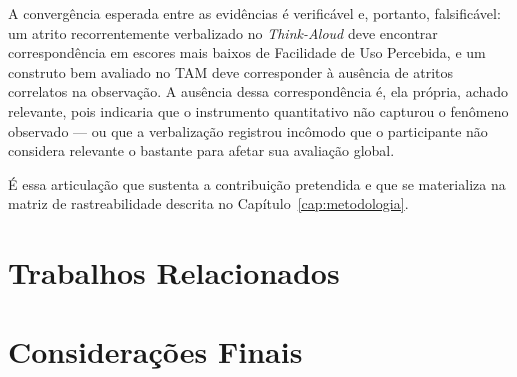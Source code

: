 A convergência esperada entre as evidências é verificável e, portanto,
falsificável: um atrito recorrentemente verbalizado no \textit{Think-Aloud} deve
encontrar correspondência em escores mais baixos de Facilidade de Uso Percebida, e
um construto bem avaliado no TAM deve corresponder à ausência de atritos
correlatos na observação. A ausência dessa correspondência é, ela própria, achado
relevante, pois indicaria que o instrumento quantitativo não capturou o fenômeno
observado --- ou que a verbalização registrou incômodo que o participante não
considera relevante o bastante para afetar sua avaliação global.

É essa articulação que sustenta a contribuição pretendida e que se materializa na
matriz de rastreabilidade descrita no Capítulo~\ref{cap:metodologia}.

\section{Trabalhos Relacionados}
\label{sec:trabalhos_relacionados}

%
%
%
%
%

\section{Considerações Finais}
\label{sec:fund_finais}

